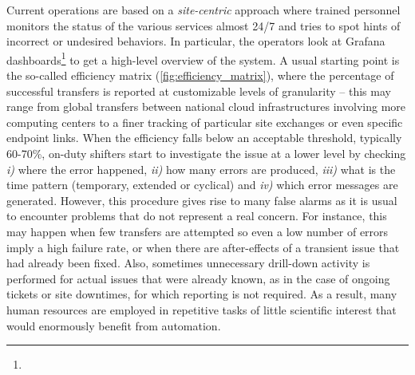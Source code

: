 Current operations are based on a \textit{site-centric} approach where trained personnel monitors the status of the various services almost 24/7 and tries to spot hints of incorrect or undesired behaviors. In particular, the operators look at Grafana dashboards\footnote{\grafana}
 to get a high-level overview of the system. A usual starting point is the so-called efficiency matrix (\cref{fig:efficiency_matrix}), where the percentage of successful transfers is reported at customizable levels of granularity -- this may range from global transfers between national cloud infrastructures involving more computing centers to a finer tracking of particular site exchanges or even specific endpoint links. %
When the efficiency falls below an acceptable threshold, typically 60-70\%, on-duty shifters start to investigate the issue at a lower level by checking \emph{i)} where the error happened, \emph{ii)} how many errors are produced, \emph{iii)} what is the time pattern (temporary, extended or cyclical) and \emph{iv)} which error messages are generated. 
However, this procedure gives rise to many false alarms as it is usual to encounter problems that do not represent a real concern. For instance, this may happen when few transfers are attempted so even a low number of errors imply a high failure rate, or when there are after-effects of a transient issue that had already been fixed. 
Also, sometimes unnecessary drill-down activity is performed for actual issues that were already known, as in the case of ongoing tickets or site downtimes, for which reporting is not required.
As a result, many human resources are employed in repetitive tasks of little scientific interest that would enormously benefit from automation. 

